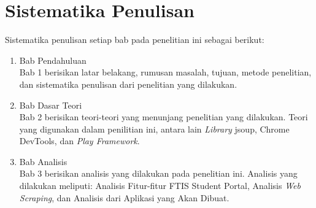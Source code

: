 \section{Sistematika Penulisan}
\label{sec:sistematika_penulisan}

Sistematika penulisan setiap bab pada penelitian ini sebagai berikut:

\begin{enumerate}
  \item Bab Pendahuluan \\
  Bab 1 berisikan latar belakang, rumusan masalah, tujuan, metode penelitian,
  dan sistematika penulisan dari penelitian yang dilakukan.
  \item Bab Dasar Teori \\
  Bab 2 berisikan teori-teori yang menunjang penelitian yang dilakukan. Teori
  yang digunakan dalam penilitian ini, antara lain \textit{Library} jsoup, Chrome DevTools, dan \textit{Play Framework}.
  \item Bab Analisis \\
  Bab 3 berisikan analisis yang dilakukan pada penelitian ini. Analisis yang
  dilakukan meliputi: Analisis Fitur-fitur FTIS Student Portal, Analisis \textit{Web Scraping}, 
	dan Analisis dari Aplikasi yang Akan Dibuat.
\end{enumerate}

